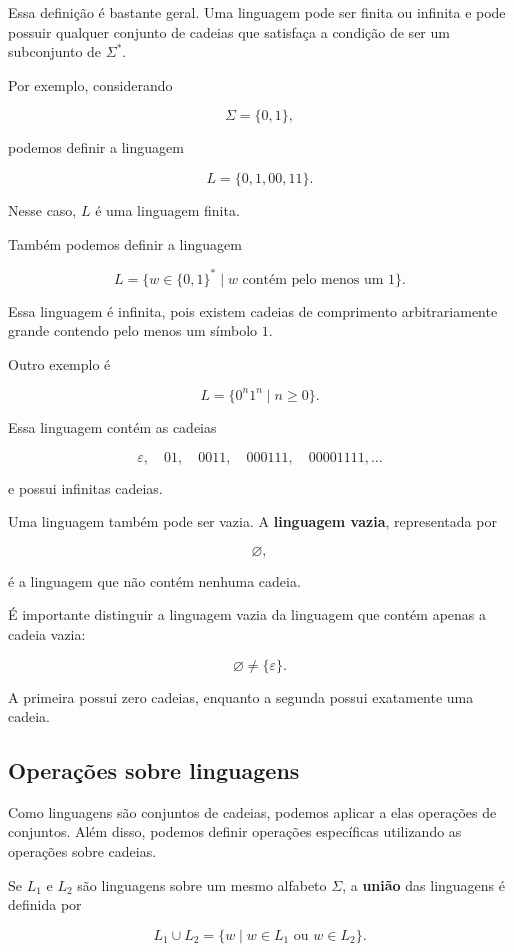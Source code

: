 \documentclass[
  brazilian,
  letterpaper,
]{book}
\theoremstyle{plain}
\theoremstyle{definition}
\theoremstyle{remark}
\begin{document}
Essa definição é bastante geral. Uma linguagem pode ser finita ou
infinita e pode possuir qualquer conjunto de cadeias que satisfaça a
condição de ser um subconjunto de \(\Sigma^*\).

Por exemplo, considerando

\[
\Sigma=\{0,1\},
\]

podemos definir a linguagem

\[
L=\{0,1,00,11\}.
\]

Nesse caso, \(L\) é uma linguagem finita.

Também podemos definir a linguagem

\[
L=\{w\in\{0,1\}^*\mid w\text{ contém pelo menos um }1\}.
\]

Essa linguagem é infinita, pois existem cadeias de comprimento
arbitrariamente grande contendo pelo menos um símbolo \(1\).

Outro exemplo é

\[
L=\{0^n1^n\mid n\geq0\}.
\]

Essa linguagem contém as cadeias

\[
\varepsilon,\quad
01,\quad
0011,\quad
000111,\quad
00001111,\ldots
\]

e possui infinitas cadeias.

Uma linguagem também pode ser vazia. A \textbf{linguagem vazia},
representada por

\[
\varnothing,
\]

é a linguagem que não contém nenhuma cadeia.

É importante distinguir a linguagem vazia da linguagem que contém apenas
a cadeia vazia:

\[
\varnothing
\neq
\{\varepsilon\}.
\]

A primeira possui zero cadeias, enquanto a segunda possui exatamente uma
cadeia.

\subsection{Operações sobre
linguagens}\label{operauxe7uxf5es-sobre-linguagens}

Como linguagens são conjuntos de cadeias, podemos aplicar a elas
operações de conjuntos. Além disso, podemos definir operações
específicas utilizando as operações sobre cadeias.

Se \(L_1\) e \(L_2\) são linguagens sobre um mesmo alfabeto \(\Sigma\),
a \textbf{união} das linguagens é definida por

\[
L_1\cup L_2=
\{w\mid w\in L_1\text{ ou }w\in L_2\}.
\]
\end{document}
